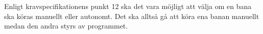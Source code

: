Enligt kravspecifikationens punkt 12 ska det vara möjligt att välja om en bana ska köras manuellt eller autonomt. Det ska alltså gå att köra ena banan manuellt medan den andra styrs av programmet.